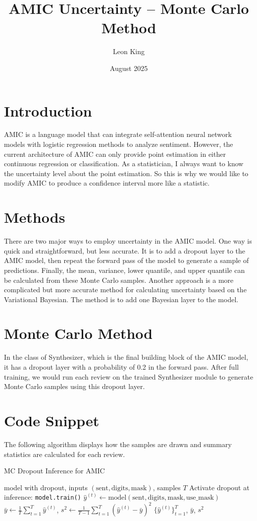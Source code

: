 \documentclass{article}
\title{AMIC Uncertainty – Monte Carlo Method}
\author{Leon King}
\date{August 2025}
\begin{document}
\maketitle

\section{Introduction}
AMIC is a language model that can integrate self-attention neural network models with logistic regression methods to analyze sentiment. However, the current architecture of AMIC can only provide point estimation in either continuous regression or classification. As a statistician, I always want to know the uncertainty level about the point estimation. So this is why we would like to modify AMIC to produce a confidence interval more like a statistic.

\section{Methods}
There are two major ways to employ uncertainty in the AMIC model. One way is quick and straightforward, but less accurate. It is to add a dropout layer to the AMIC model, then repeat the forward pass of the model to generate a sample of predictions. Finally, the mean, variance, lower quantile, and upper quantile can be calculated from these Monte Carlo samples. Another approach is a more complicated but more accurate method for calculating uncertainty based on the Variational Bayesian. The method is to add one Bayesian layer to the model.  

\section{Monte Carlo Method}
In the class of Synthesizer, which is the final building block of the AMIC model, it has a dropout layer with a probability of 0.2 in the forward pass. After full training, we would run each review on the trained Synthesizer module to generate Monte Carlo samples using this dropout layer. 

\section{Code Snippet}
The following algorithm displays how the samples are drawn and summary statistics are calculated for each review. 
\begin{algorithm}[!ht]
\caption{MC Dropout Inference for AMIC}
\label{alg:mc-dropout}
\begin{algorithmic}[1]
\Require model with dropout, inputs $(\text{sent}, \text{digits}, \text{mask})$, samples $T$
\State Activate dropout at inference: \texttt{model.train()}
  \State $\hat{y}^{(t)} \gets \text{model}(\text{sent}, \text{digits}, \text{mask}, \text{use\_mask})$
\EndFor
\State $\bar{y} \gets \frac{1}{T}\sum_{t=1}^T \hat{y}^{(t)}$, \quad
$s^2 \gets \frac{1}{T-1}\sum_{t=1}^T(\hat{y}^{(t)}-\bar{y})^2$
\State \Return $\{\hat{y}^{(t)}\}_{t=1}^T$, $\bar{y}$, $s^2$
\end{algorithmic}
\end{algorithm}
\end{document}
